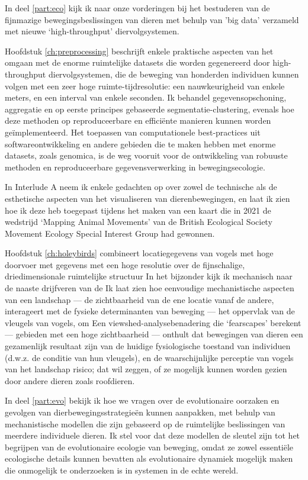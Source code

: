 In deel \ref{part:eco} kijk ik naar onze vorderingen bij het bestuderen van de fijnmazige bewegingsbeslissingen van dieren met behulp van 'big data' verzameld met nieuwe `high-throughput' diervolgsystemen.

Hoofdstuk \ref{ch:preprocessing} beschrijft enkele praktische aspecten van het omgaan met de enorme ruimtelijke datasets die worden gegenereerd door high-throughput diervolgsystemen, die de beweging van honderden individuen kunnen volgen met een zeer hoge ruimte-tijdresolutie: een nauwkeurigheid van enkele meters, en een interval van enkele seconden. Ik behandel gegevensopschoning, aggregatie en op eerste principes gebaseerde segmentatie-clustering, evenals hoe deze methoden op reproduceerbare en effici{\"e}nte manieren kunnen worden ge{\"i}mplementeerd. Het toepassen van computationele best-practices uit softwareontwikkeling en andere gebieden die te maken hebben met enorme datasets, zoals genomica, is de weg vooruit voor de ontwikkeling van robuuste methoden en reproduceerbare gegevensverwerking in bewegingsecologie.

In Interlude A neem ik enkele gedachten op over zowel de technische als de esthetische aspecten van het visualiseren van dierenbewegingen, en laat ik zien hoe ik deze heb toegepast tijdens het maken van een kaart die in 2021 de wedstrijd `Mapping Animal Movements' van de British Ecological Society Movement Ecology Special Interest Group had gewonnen.

Hoofdstuk \ref{ch:holeybirds} combineert locatiegegevens van vogels met hoge doorvoer met gegevens met een hoge resolutie over de fijnschalige, driedimensionale ruimtelijke structuur
In het bijzonder kijk ik mechanisch naar de naaste drijfveren van de
Ik laat zien hoe eenvoudige mechanistische aspecten van een landschap --- de zichtbaarheid van de ene locatie vanaf de andere, interageert met de fysieke determinanten van beweging --- het oppervlak van de vleugels van vogels, om
Een viewshed-analysebenadering die `fearscapes' berekent --- gebieden met een hoge zichtbaarheid --- onthult dat bewegingen van dieren een gezamenlijk resultaat zijn van de huidige fysiologische toestand van individuen (d.w.z. de conditie van hun vleugels), en de waarschijnlijke perceptie van vogels van het landschap risico; dat wil zeggen, of ze mogelijk kunnen worden gezien door andere dieren zoals roofdieren.

In deel \ref{part:evo} bekijk ik hoe we vragen over de evolutionaire oorzaken en gevolgen van dierbewegingsstrategie{\"e}n kunnen aanpakken, met behulp van mechanistische modellen die zijn gebaseerd op de ruimtelijke beslissingen van meerdere individuele dieren. Ik stel voor dat deze modellen de sleutel zijn tot het begrijpen van de evolutionaire ecologie van beweging, omdat ze zowel essenti{\"e}le ecologische details kunnen bevatten als evolutionaire dynamiek mogelijk maken die onmogelijk te onderzoeken is in systemen in de echte wereld.

